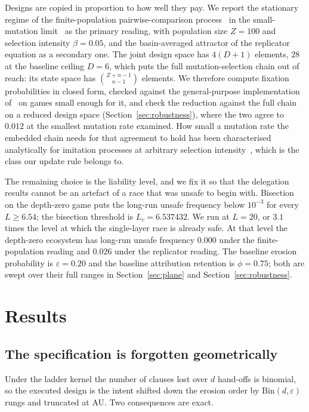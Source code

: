 \documentclass[11pt,a4paper]{article}
\theoremstyle{definition}
\newcommand{\AU}{\textsf{AU}}
\begin{document}
Designs are copied in proportion to how well they pay. We report the stationary
regime of the finite-population pairwise-comparison
process~\citep{sandholm2010population} in the small-mutation
limit~\citep{fudenberg2006imitation,fudenberg2006strong,nowak2004emergence} as
the primary reading,
with population size $Z=100$ and selection intensity $\beta=0.05$, and the
basin-averaged attractor of the replicator equation as a secondary one. The
joint design space has $4(D+1)$ elements, $28$ at the baseline ceiling $D=6$,
which puts the full mutation-selection chain out of reach: its state space has
$\binom{Z+n-1}{n-1}$ elements. We therefore compute fixation probabilities in
closed form, checked against the general-purpose implementation
of~\citet{domingos2023egttools} on games small enough for it, and check the
reduction against the full chain on a reduced design
space (Section~\ref{sec:robustness}), where the two agree to $0.012$ at the
smallest mutation rate examined. How small a mutation rate the embedded chain
needs for that agreement to hold has been characterised analytically for
imitation processes at arbitrary selection intensity~\citep{wu2012howsmall},
which is the class our update rule belongs to.

The remaining choice is the liability level, and we fix it so that the
delegation results cannot be an artefact of a race that was unsafe to begin
with. Bisection on the depth-zero game puts the long-run unsafe frequency below
$10^{-3}$ for every $L\ge 6.54$; the bisection threshold is $L_c=6.537432$.
We run at $L=20$, or $3.1$ times the level at which the single-layer race is
already safe. At that level the
depth-zero ecosystem has long-run unsafe frequency $0.000$ under the
finite-population reading and $0.026$ under the replicator reading. The
baseline erosion probability is $\varepsilon=0.20$ and the baseline attribution
retention is $\phi=0.75$; both are swept over their full ranges in
Section~\ref{sec:plane} and Section~\ref{sec:robustness}.

\section{Results}
\label{sec:results}

\subsection{The specification is forgotten geometrically}
\label{sec:erosion}

Under the ladder kernel the number of clauses lost over $d$ hand-offs is
binomial, so the executed design is the intent shifted down the erosion order
by $\mathrm{Bin}(d,\varepsilon)$ rungs and truncated at \AU{}. Two consequences
are exact.
\end{document}
